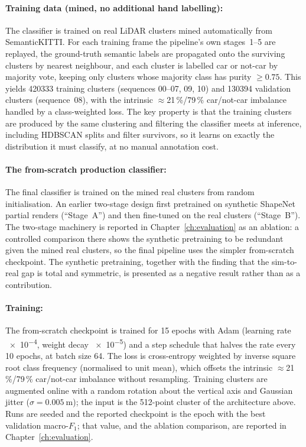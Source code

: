\paragraph{Training data (mined, no additional hand labelling):} The classifier is trained
on real LiDAR clusters mined automatically from SemanticKITTI. For each training frame the pipeline's own
stages~1--5 are replayed, the ground-truth semantic labels are propagated onto the
surviving clusters by nearest neighbour, and each cluster is labelled car
or not-car by majority vote, keeping only clusters whose majority class
has purity $\geq \num{0.75}$. This yields \num{420333} training clusters
(sequences 00--07, 09, 10) and \num{130394} validation clusters (sequence~08),
with the intrinsic $\approx$21\,\%/79\,\% car/not-car imbalance handled by a
class-weighted loss. The key property is that the training clusters are produced
by the same clustering and filtering the classifier meets at inference,
including HDBSCAN splits and filter survivors, so it learns on exactly the
distribution it must classify, at no manual annotation cost.

\paragraph{The from-scratch production classifier:} The final classifier is
trained on the mined real clusters from random initialisation. An earlier
two-stage design first pretrained on synthetic ShapeNet partial renders
(``Stage~A'') and then fine-tuned on the real clusters (``Stage~B''). The
two-stage machinery is reported in Chapter~\ref{ch:evaluation} as an ablation:
a controlled comparison there shows the synthetic pretraining to be redundant given the
mined real clusters, so the final pipeline uses the simpler from-scratch checkpoint. The
synthetic pretraining, together with the finding that the sim-to-real gap is total and
symmetric, is presented as a negative result rather than as a contribution.

\paragraph{Training:} The from-scratch checkpoint is trained for \num{15} epochs
with Adam (learning rate \num{e-4}, weight decay \num{e-5}) and a step schedule
that halves the rate every \num{10} epochs, at batch size \num{64}. The loss is
cross-entropy weighted by inverse square root class frequency (normalised to unit
mean), which offsets the intrinsic $\approx$21\,\%/79\,\% car/not-car imbalance
without resampling. Training clusters are augmented online with a random rotation
about the vertical axis and Gaussian jitter ($\sigma = \SI{0.005}{\meter}$); the
input is the \num{512}-point cluster of the architecture above. Runs are seeded
and the reported checkpoint is the epoch with the best validation macro-$F_1$; that
value, and the ablation comparison, are reported in Chapter~\ref{ch:evaluation}.

